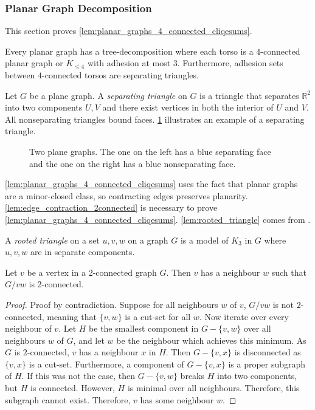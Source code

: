 \subsubsection{Planar Graph Decomposition}
This section proves \cref{lem:planar_graphs_4_connected_cliqesums}.
\begin{proposition}\label{lem:planar_graphs_4_connected_cliqesums}
	Every planar graph has a tree-decomposition where each torso is a \(4\)-connected planar graph or $K_{\leq 4}$ with adhesion at most \(3\). Furthermore, adhesion sets between $4$-connected torsos are separating triangles.
\end{proposition}
Let $G$ be a plane graph. A \textit{separating triangle} on $G$ is a triangle that separates $\mathbb{R}^2$ into two components $U, V$ and there exist vertices in both the interior of $U$ and $V$. All nonseparating triangles bound faces. \cref{fig:separating_triangle} illustrates an example of a separating triangle. 
\begin{figure}[h!]
	
	\caption[Separating faces]{Two plane graphs. The one on the left has a blue separating face and the one on the right has a blue nonseparating face.}\label{fig:separating_triangle}
\end{figure}

\cref{lem:planar_graphs_4_connected_cliqesums} uses the fact that planar graphs are a minor-closed class, so contracting edges preserves planarity. \cref{lem:edge_contraction_2connected} is necessary to prove \cref{lem:planar_graphs_4_connected_cliqesums}. \cref{lem:rooted_triangle} comes from \textcite{woodThomassensChoosabilityArgument2010}.

A \textit{rooted triangle} on a set $u, v, w$ on a graph $G$ is a model of $K_3$ in $G$ where $u, v, w$ are in separate components. 

\begin{lemma}\label{lem:edge_contraction_2connected}
	Let $v$ be a vertex in a 2-connected graph $G$. Then $v$ has a neighbour $w$ such that $G/vw$ is 2-connected.
\end{lemma}
\begin{proof}
	Proof by contradiction. Suppose for all neighbours $w$ of $v$, $G/vw$ is not $2$-connected, meaning that $\{v,w\}$ is a cut-set for all $w$. Now iterate over every neighbour of $v$. Let $H$ be the smallest component in $G - \{v,w\}$ over all neighbours $w$ of $G$, and let $w$ be the neighbour which achieves this minimum. As $G$ is $2$-connected, $v$ has a neighbour $x$ in $H$. Then $G - \{v, x\}$ is disconnected as $\{v,x\}$ is a cut-set. Furthermore, a component of $G - \{v,x\}$ is a proper subgraph of $H$. If this was not the case, then $G - \{v,w\}$ breaks $H$ into two components, but $H$ is connected. However, $H$ is minimal over all neighbours. Therefore, this subgraph cannot exist. Therefore, $v$ has some neighbour $w$. 
\end{proof}

